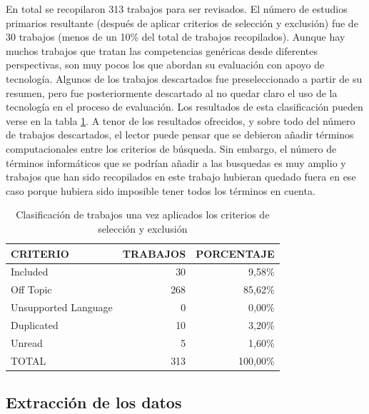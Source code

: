 En total se recopilaron 313 trabajos para ser revisados. El número de estudios primarios resultante (después de aplicar criterios de selección y exclusión) fue de 30 trabajos (menos de un 10\% del total de trabajos recopilados). Aunque hay muchos trabajos que tratan las competencias genéricas desde diferentes perspectivas, son muy pocos los que abordan su evaluación con apoyo de tecnología. Algunos de los trabajos descartados fue preseleccionado a partir de su resumen, pero fue posteriormente descartado al no quedar claro el uso de la tecnología en el proceso de evaluación. Los resultados de esta clasificación pueden verse en la tabla \ref{tab:ResumenSelecccionResultados}. A tenor de los resultados ofrecidos, y sobre todo del número de trabajos descartados, el lector puede pensar que se debieron añadir términos computacionales entre los criterios de búsqueda. Sin embargo, el número de términos informáticos que se podrían añadir a las busquedas es muy amplio y trabajos que han sido recopilados en este trabajo hubieran quedado fuera en ese caso porque hubiera sido imposible tener todos los términos en cuenta.

\begin{table}
  \begin{center}
  \begin{tabular}{| m{4cm} | r | r |}
    \hline
    CRITERIO & TRABAJOS & PORCENTAJE\\
    \hline
    \hline 
    Included & 30 & 9,58\% \\
    \hline
    Off Topic & 268 & 85,62\% \\
    \hline
    Unsupported Language & 0 & 0,00\% \\
    \hline
    Duplicated & 10 & 3,20\% \\
    \hline
    Unread & 5 & 1,60\% \\
    \hline
    TOTAL & 313 & 100,00\% \\
    \hline
  \end{tabular}
\end{center}
\caption{Clasificación de trabajos una vez aplicados los criterios de selección y exclusión}
\label{tab:ResumenSelecccionResultados}
\end{table} 

\subsection{Extracción de los datos}

